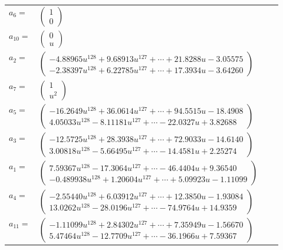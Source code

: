 \documentclass[1p]{elsarticle_modified}
\theoremstyle{definition}
\begin{document}
\begin{tabular}{m{7pt} m{180pt} m{7pt} m{180pt} }
\flushright $a_{6}=$&$\begin{pmatrix}1\\0\end{pmatrix}$ \\
\flushright $a_{10}=$&$\begin{pmatrix}0\\u\end{pmatrix}$ \\
\flushright $a_{2}=$&$\begin{pmatrix}-4.88965 u^{128}+9.68913 u^{127}+\cdots+21.8288 u-3.05575\\-2.38397 u^{128}+6.22785 u^{127}+\cdots+17.3934 u-3.64260\end{pmatrix}$ \\
\flushright $a_{7}=$&$\begin{pmatrix}1\\u^2\end{pmatrix}$ \\
\flushright $a_{5}=$&$\begin{pmatrix}-16.2649 u^{128}+36.0614 u^{127}+\cdots+94.5515 u-18.4908\\4.05033 u^{128}-8.11181 u^{127}+\cdots-22.0327 u+3.82688\end{pmatrix}$ \\
\flushright $a_{3}=$&$\begin{pmatrix}-12.5725 u^{128}+28.3938 u^{127}+\cdots+72.9033 u-14.6140\\3.00818 u^{128}-5.66495 u^{127}+\cdots-14.4581 u+2.25274\end{pmatrix}$ \\
\flushright $a_{1}=$&$\begin{pmatrix}7.59367 u^{128}-17.3064 u^{127}+\cdots-46.4404 u+9.36540\\-0.489938 u^{128}+1.20604 u^{127}+\cdots+5.09923 u-1.11099\end{pmatrix}$ \\
\flushright $a_{4}=$&$\begin{pmatrix}-2.55440 u^{128}+6.03912 u^{127}+\cdots+12.3850 u-1.93084\\13.0262 u^{128}-28.0196 u^{127}+\cdots-74.9764 u+14.9359\end{pmatrix}$ \\
\flushright $a_{11}=$&$\begin{pmatrix}-1.11099 u^{128}+2.84302 u^{127}+\cdots+7.35949 u-1.56670\\5.47464 u^{128}-12.7709 u^{127}+\cdots-36.1966 u+7.59367\end{pmatrix}$ \\

\end{tabular}
\end{document}
